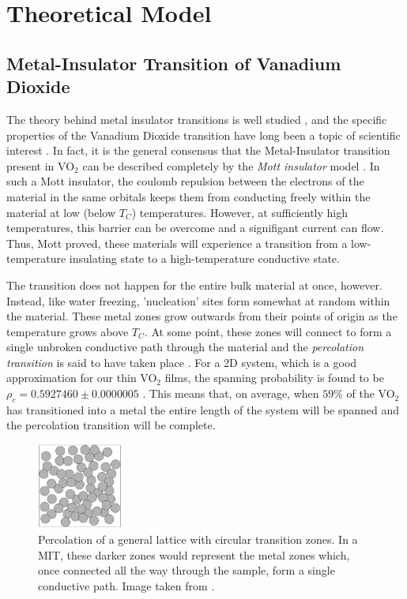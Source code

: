 \documentclass[%
 reprint,
 amsmath,amssymb,
 aps,
 pra,
]{revtex4-1}
\begin{document}
\section{Theoretical Model}

\subsection{Metal-Insulator Transition of Vanadium Dioxide}

The theory behind metal insulator transitions is well studied \cite{phase_2}, and the specific properties of the Vanadium Dioxide transition have long been a topic of scientific interest \cite{manual, vo2_1, vo2_2}. In fact, it is the general consensus that the Metal-Insulator transition present in VO$_2$ can be described completely by the \textit{Mott insulator} model \cite{manual}. In such a Mott insulator, the coulomb repulsion between the electrons of the material in the same orbitals keeps them from conducting freely within the material at low (below $T_C$) temperatures. However, at sufficiently high temperatures, this barrier can be overcome and a signifigant current can flow. Thus, Mott proved, these materials will experience a transition from a low-temperature insulating state to a high-temperature conductive state.

The transition does not happen for the entire bulk material at once, however. Instead, like water freezing, 'nucleation' sites form somewhat at random within the material. These metal zones grow outwards from their points of origin as the temperature grows above $T_C$. At some point, these zones will connect to form a single unbroken conductive path through the material and the \textit{percolation transition} is said to have taken place \cite{perc}. For a 2D system, which is a good approximation for our thin VO$_2$ films, the spanning probability is found to be $\rho_c = 0.592 7460 \pm 0.000 0005 $ \cite{perc,perc2}. This means that, on average, when $59\%$ of the VO$_2$ has transitioned into a metal the entire length of the system will be spanned and the percolation transition will be complete.

\begin{figure}[H]
	\centering
	\includegraphics[width=0.25\textwidth]{percolation.png}
	\caption{Percolation of a general lattice with circular transition zones. In a MIT, these darker zones would represent the metal zones which, once connected all the way through the sample, form a single conductive path. Image taken from \cite{perc}.}
	\label{fig:perc}
\end{figure}
\end{document}
